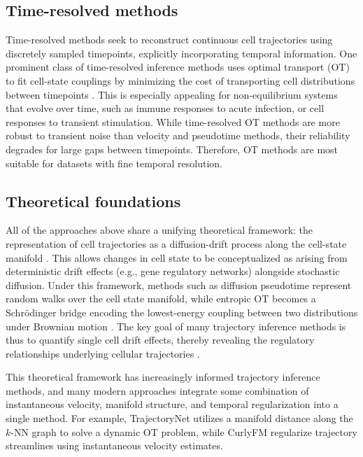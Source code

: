 \subsection{Time-resolved methods}
Time-resolved methods seek to reconstruct continuous cell trajectories using discretely sampled timepoints, explicitly incorporating temporal information. One prominent class of time-resolved inference methods uses optimal transport (OT) to fit cell-state couplings by minimizing the cost of transporting cell distributions between timepoints \citep{schiebingerOptimalTransportAnalysisSingleCell2019, kleinMappingCellsTime2025}. This is especially appealing for non-equilibrium systems that evolve over time, such as immune responses to acute infection, or cell responses to transient stimulation. While time-resolved OT methods are more robust to transient noise than velocity and pseudotime methods, their reliability degrades for large gaps between timepoints. Therefore, OT methods are most suitable for datasets with fine temporal resolution.

\subsection{Theoretical foundations}
All of the approaches above share a unifying theoretical framework: the representation of cell trajectories as a diffusion-drift process along the cell-state manifold \citep{lavenantMathematicalTheoryTrajectory2021, yeoGenerativeModelingSinglecell2021, weinrebFundamentalLimitsDynamic2018}. This allows changes in cell state to be conceptualized as arising from deterministic drift effects (e.g., gene regulatory networks) alongside stochastic diffusion. Under this framework, methods such as diffusion pseudotime represent random walks over the cell state manifold, while entropic OT becomes a Schr\"odinger bridge encoding the lowest-energy coupling between two distributions under Brownian motion \citep{parisetUnbalancedDiffusionSchrodinger2023, tongSimulationfreeSchrodingerBridges2024}. The key goal of many trajectory inference methods is thus to quantify single cell drift effects, thereby revealing the regulatory relationships underlying cellular trajectories \citep{shaReconstructingGrowthDynamic2024}.

This theoretical framework has increasingly informed trajectory inference methods, and many modern approaches integrate some combination of instantaneous velocity, manifold structure, and temporal regularization into a single method. For example, TrajectoryNet \citep{tongTrajectoryNetDynamicOptimal2020} utilizes a manifold distance along the $k$-NN graph to solve a dynamic OT problem, while CurlyFM \citep{petrovicCurlyFlowMatching2025a} regularize trajectory streamlines using instantaneous velocity estimates.

